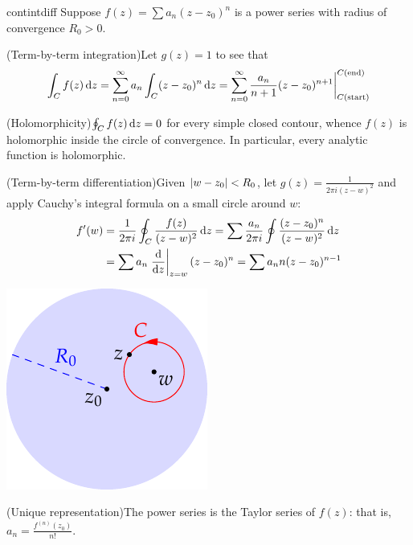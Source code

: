 \begin{cor}{}{contintdiff}
Suppose $f(z)=\sum a_n(z-z_0)^n$ is a power series with radius of convergence $R_0>0$.
\begin{enumerate}
  \item (Term-by-term integration)\quad Let $g(z)=1$ to see that
  \[\int_Cf(z)\,{\mathrm{d} z}=\sum_{n=0}^\infty a_n\int_C (z-z_0)^n\,{\mathrm{d} z} =\sum_{n=0}^\infty\frac{a_n}{n+1}(z-z_0)^{n+1}\bigg|_{C(\text{start})}^{C(\text{end})}\]
  
  \item (Holomorphicity)\quad $\oint_Cf(z)\,{\mathrm{d} z}=0$ for every simple closed contour, whence $f(z)$ is holomorphic inside the circle of convergence. In particular, every analytic function is holomorphic.
  
	\begin{minipage}[t]{0.71\linewidth}\vspace{0pt}
  \item (Term-by-term differentiation)\quad Given $\left| w-z_0\right|<R_0$, let $g(z)=\frac 1{2\pi i(z-w)^2}$ and apply Cauchy's integral formula on a small circle around $w$:
  \begin{align*}
  f'(w)&=\frac 1{2\pi i}\oint_C\frac{f(z)}{(z-w)^2}\,{\mathrm{d} z} =\sum \frac{a_n}{2\pi i}\oint\frac{(z-z_0)^n}{(z-w)^2}\,{\mathrm{d} z}\\
  &=\sum a_n\left.\frac{\mathrm{d} }{\mathrm{d} z}\right|_{z=w}(z-z_0)^n =\sum a_nn(z-z_0)^{n-1}
  \end{align*}
	\end{minipage}\begin{minipage}[t]{0.29\linewidth}\vspace{-5pt}
	\flushright\includegraphics[scale=0.85]{diff}
	\end{minipage}
	
	\item (Unique representation)\quad The power series is the Taylor series of $f(z)$: that is, $a_n=\frac{f^{(n)}(z_0)}{n!}$.
\end{enumerate}
\end{cor}

